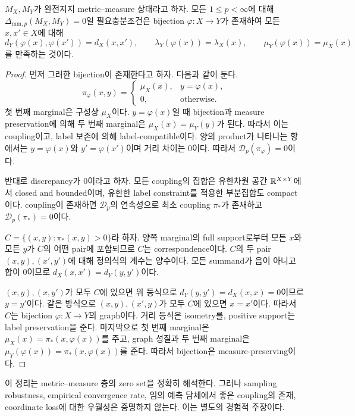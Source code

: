 \begin{theorem}
$M_X,M_Y$가 완전지지 metric--measure 상태라고 하자. 모든
$1\leq p<\infty$에 대해
$\Delta_{\mathrm{mm},p}(M_X,M_Y)=0$일 필요충분조건은
bijection $\varphi:X\to Y$가 존재하여 모든 $x,x'\in X$에 대해
\[
 d_Y(\varphi(x),\varphi(x'))=d_X(x,x'),\qquad
 \lambda_Y(\varphi(x))=\lambda_X(x),\qquad
 \mu_Y(\varphi(x))=\mu_X(x)
\]
를 만족하는 것이다.
\end{theorem}

\begin{proof}
먼저 그러한 bijection이 존재한다고 하자. 다음과 같이 둔다.
\[
 \pi_\varphi(x,y)=
 \begin{cases}
 \mu_X(x),&y=\varphi(x),\\
 0,&\text{otherwise}.
 \end{cases}
\]
첫 번째 marginal은 구성상 $\mu_X$이다. $y=\varphi(x)$일 때 bijection과
measure preservation에 의해 두 번째 marginal은
$\mu_X(x)=\mu_Y(y)$가 된다. 따라서 이는 coupling이고, label 보존에
의해 label-compatible이다. 양의 product가 나타나는 항에서는
$y=\varphi(x)$와 $y'=\varphi(x')$이며 거리 차이는 0이다. 따라서
$\mathcal D_p(\pi_\varphi)=0$이다.

반대로 discrepancy가 0이라고 하자. 모든 coupling의 집합은 유한차원 공간
$\mathbb{R}^{X\times Y}$에서 closed and bounded이며, 유한한 label constraint를
적용한 부분집합도 compact이다. coupling이 존재하면 $\mathcal D_p$의
연속성으로 최소 coupling $\pi_*$가 존재하고
$\mathcal D_p(\pi_*)=0$이다.

$C=\{(x,y):\pi_*(x,y)>0\}$라 하자. 양쪽 marginal의 full support로부터
모든 $x$와 모든 $y$가 $C$의 어떤 pair에 포함되므로 $C$는 correspondence이다.
$C$의 두 pair $(x,y),(x',y')$에 대해 정의식의 계수는 양수이다. 모든
summand가 음이 아니고 합이 0이므로
$d_X(x,x')=d_Y(y,y')$이다.

$(x,y),(x,y')$가 모두 $C$에 있으면 위 등식으로
$d_Y(y,y')=d_X(x,x)=0$이므로 $y=y'$이다. 같은 방식으로
$(x,y),(x',y)$가 모두 $C$에 있으면 $x=x'$이다. 따라서 $C$는 bijection
$\varphi:X\to Y$의 graph이다. 거리 등식은 isometry를, positive support는
label preservation을 준다. 마지막으로 첫 번째 marginal은
$\mu_X(x)=\pi_*(x,\varphi(x))$를 주고, graph 성질과 두 번째 marginal은
$\mu_Y(\varphi(x))=\pi_*(x,\varphi(x))$를 준다. 따라서 bijection은
measure-preserving이다.
\end{proof}


이 정리는 metric--measure 층의 zero set을 정확히 해석한다. 그러나 sampling
robustness, empirical convergence rate, 임의 예측 담체에서 좋은 coupling의
존재, coordinate loss에 대한 우월성은 증명하지 않는다. 이는 별도의 경험적
주장이다.


